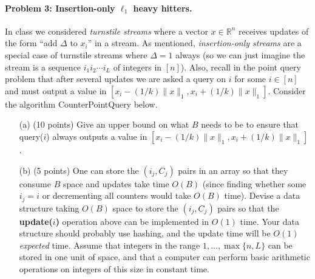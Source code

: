 \documentclass[12pt]{article}
\newcommand{\R}{\mathbb{R}}
\begin{document}
\paragraph{Problem 3: Insertion-only $\ell_1$ heavy hitters.}

In class we considered {\em turnstile streams} where a vector $x\in\R^n$ receives updates of the form ``add $\Delta$ to $x_i$'' in a stream. As mentioned, {\em insertion-only streams} are a special case of turnstile streams where $\Delta=1$ always (so we can just imagine the stream is a sequence $i_1 i_2 \cdots i_L$ of integers in $[n]$). Also, recall in the point query problem that after several updates we are asked a query on $i$ for some $i\in[n]$ and must output a value in $[x_i - (1/k)\|x\|_1, x_i + (1/k)\|x\|_1]$. Consider the algorithm CounterPointQuery below.

\begin{center}
\end{center}

\begin{itemize}
\item[(a)] (10 points) Give an upper bound on what $B$ needs to be to ensure that query($i$) always outputs a value in $[x_i - (1/k)\|x\|_1, x_i + (1/k)\|x\|_1]$.
\item[(b)] (5 points) One can store the $(i_j,C_j)$ pairs in an array so that they consume $B$ space and updates take time $O(B)$ (since finding whether some $i_j=i$ or decrementing all counters would take $O(B)$ time). Devise a data structure taking $O(B)$ space to store the $(i_j,C_j)$ pairs so that the \textbf{update($i$)} operation above can be implemented in $O(1)$ time. Your data structure should probably use hashing, and the update time will be $O(1)$ {\em expected} time. Assume that integers in the range $1,\ldots,\max\{n,L\}$ can be stored in one unit of space, and that a computer can perform basic arithmetic operations on integers of this size in constant time.
\end{itemize}
\end{document}
